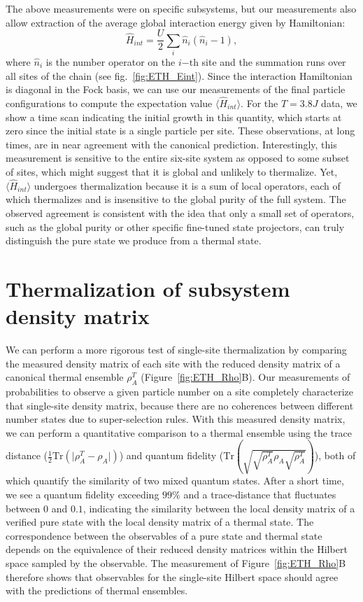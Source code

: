 The above measurements were on specific subsystems, but our measurements also allow extraction of the average global interaction energy given by Hamiltonian:
\begin{equation}
\hat{H}_{int}=\frac{U}{2}\sum_i \hat{n}_i(\hat{n}_i-1),
\end{equation}
where $\hat{n}_i$ is the number operator on the $i\mathrm{-th}$ site and the summation runs over all sites of the chain (see fig.~\ref{fig:ETH_Eint}). Since the interaction Hamiltonian is diagonal in the Fock basis, we can use our measurements of the final particle configurations to compute the expectation value $\langle \hat{H}_{int} \rangle$. For the $T=3.8J$ data, we show a time scan indicating the initial growth in this quantity, which starts at zero since the initial state is a single particle per site.  These observations, at long times, are in near agreement with the canonical prediction. Interestingly, this measurement is sensitive to the entire six-site system as opposed to some subset of sites, which might suggest that it is global and unlikely to thermalize. Yet, $\langle \hat{H}_{int} \rangle$ undergoes thermalization because it is a sum of local operators, each of which thermalizes and is insensitive to the global purity of the full system.  The observed agreement is consistent with the idea that only a small set of operators, such as the global purity or other specific fine-tuned state projectors, can truly distinguish the pure state we produce from a thermal state.

\section{Thermalization of subsystem density matrix}

We can perform a more rigorous test of single-site thermalization by comparing the measured density matrix of each site with the reduced density matrix of a canonical thermal ensemble $\rho_A^T$ (Figure~\ref{fig:ETH_Rho}B). Our measurements of probabilities to observe a given particle number on a site completely characterize that single-site density matrix, because there are no coherences between different number states due to super-selection rules. With this measured density matrix, we can perform a quantitative comparison to a thermal ensemble using the trace distance ($\frac{1}{2}\mathrm{Tr}(\vert \rho_A^T -  \rho_A \vert)$) and quantum fidelity ($\mathrm{Tr}\left ( \sqrt{\sqrt{\rho_A^T} \rho_A \sqrt{\rho_A^T}}\right )$), both of which quantify the similarity of two mixed quantum states. After a short time, we see a quantum fidelity exceeding $99\%$ and a trace-distance that fluctuates between $0$ and $0.1$, indicating the similarity between the local density matrix of a verified pure state with the local density matrix of a thermal state. The correspondence between the observables of a pure state and thermal state depends on the equivalence of their reduced density matrices within the Hilbert space sampled by the observable. The measurement of Figure~\ref{fig:ETH_Rho}B therefore shows that observables for the single-site Hilbert space should agree with the predictions of thermal ensembles. 

